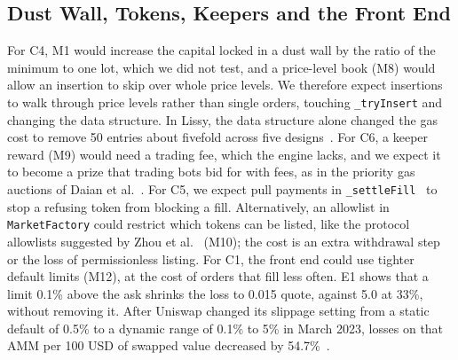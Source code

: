 \subsection{Dust Wall, Tokens, Keepers and the Front End}\label{sec:m8to12}
For C4, M1 would increase the capital locked in a dust wall by the ratio of the minimum to one lot, which we did not test, and a price-level book (M8) would allow an insertion to skip over whole price levels. %
We therefore expect insertions to walk through price levels rather than single orders, touching \texttt{\_tryInsert} and changing the data structure. In Lissy, the data structure alone changed the gas cost to remove 50 entries about fivefold across five designs~\cite{src09moosavi2023}. %
For C6, a keeper reward (M9) would need a trading fee, which the engine lacks, and we expect it to become a prize that trading bots bid for with fees, as in the priority gas auctions of Daian et al.~\cite{src01daian2020}. %
For C5, we expect pull payments in \texttt{\_settleFill}~\cite{src15grech2018} to stop a refusing token from blocking a fill. %
Alternatively, an allowlist in \texttt{MarketFactory} could restrict which tokens can be listed, like the protocol allowlists suggested by Zhou et al.~\cite{src06zhou2023} (M10); the cost is an extra withdrawal step or the loss of permissionless listing. %
For C1, the front end could use tighter default limits (M12), at the cost of orders that fill less often. %
E1 shows that a limit 0.1\% above the ask shrinks the loss to 0.015 quote, against 5.0 at 33\%, without removing it. %
After Uniswap changed its slippage setting from a static default of 0.5\% to a dynamic range of 0.1\% to 5\% in March 2023, losses on that AMM per 100 USD of swapped value decreased by 54.7\%~\cite{src34chemaya2025}. %

